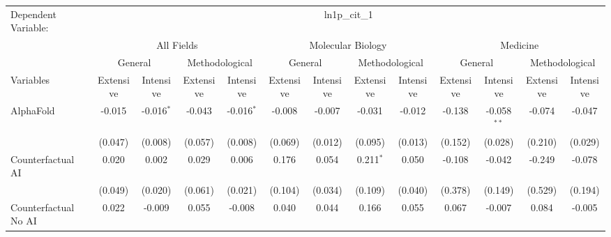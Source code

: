 \begingroup
\centering
\begin{tabular}{lcccccccccccc}
   \tabularnewline \midrule \midrule
   Dependent Variable: & \multicolumn{12}{c}{ln1p\_cit\_1}\\
 & \multicolumn{4}{c}{All Fields} & \multicolumn{4}{c}{Molecular Biology} & \multicolumn{4}{c}{Medicine} \\
\cmidrule(lr){2-5} \cmidrule(lr){6-9} \cmidrule(lr){10-13}
 & \multicolumn{2}{c}{General} & \multicolumn{2}{c}{Methodological} & \multicolumn{2}{c}{General} & \multicolumn{2}{c}{Methodological} & \multicolumn{2}{c}{General} & \multicolumn{2}{c}{Methodological} \\
\cmidrule(lr){2-3} \cmidrule(lr){4-5} \cmidrule(lr){6-7} \cmidrule(lr){8-9} \cmidrule(lr){10-11} \cmidrule(lr){12-13}
Variables & \multicolumn{1}{c}{Extensive} & \multicolumn{1}{c}{Intensive} & \multicolumn{1}{c}{Extensive} & \multicolumn{1}{c}{Intensive} & \multicolumn{1}{c}{Extensive} & \multicolumn{1}{c}{Intensive} & \multicolumn{1}{c}{Extensive} & \multicolumn{1}{c}{Intensive} & \multicolumn{1}{c}{Extensive} & \multicolumn{1}{c}{Intensive} & \multicolumn{1}{c}{Extensive} & \multicolumn{1}{c}{Intensive} \\
\cmidrule(lr){1-1}\cmidrule(lr){2-2} \cmidrule(lr){3-3} \cmidrule(lr){4-4} \cmidrule(lr){5-5} \cmidrule(lr){6-6} \cmidrule(lr){7-7} \cmidrule(lr){8-8} \cmidrule(lr){9-9} \cmidrule(lr){10-10} \cmidrule(lr){11-11} \cmidrule(lr){12-12} \cmidrule(lr){13-13}
   AlphaFold                                & -0.015  & -0.016$^{*}$ & -0.043  & -0.016$^{*}$ & -0.008  & -0.007  & -0.031      & -0.012  & -0.138  & -0.058$^{**}$ & -0.074  & -0.047\\   
                                            & (0.047) & (0.008)      & (0.057) & (0.008)      & (0.069) & (0.012) & (0.095)     & (0.013) & (0.152) & (0.028)       & (0.210) & (0.029)\\   
   Counterfactual AI                        & 0.020   & 0.002        & 0.029   & 0.006        & 0.176   & 0.054   & 0.211$^{*}$ & 0.050   & -0.108  & -0.042        & -0.249  & -0.078\\   
                                            & (0.049) & (0.020)      & (0.061) & (0.021)      & (0.104) & (0.034) & (0.109)     & (0.040) & (0.378) & (0.149)       & (0.529) & (0.194)\\   
   Counterfactual No AI                     & 0.022   & -0.009       & 0.055   & -0.008       & 0.040   & 0.044   & 0.166       & 0.055   & 0.067   & -0.007        & 0.084   & -0.005\\   

\end{tabular}
